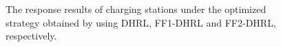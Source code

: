 \documentclass[preprint,12pt]{elsarticle}
\begin{document}

\begin{figure}[h]
  \centering
  \hfill %
  \caption{The response results of charging stations under the optimized strategy obtained by using DHRL, FF1-DHRL and FF2-DHRL, respectively.}
\end{figure}
\end{document}
